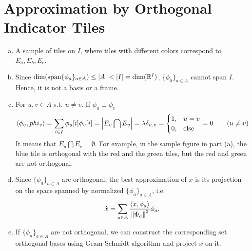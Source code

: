 \section{Approximation by Orthogonal Indicator Tiles}\label{sec:part4}

\begin{enumerate}[(a)]
\item A sample of tiles on $I$, where tiles with different colors correspond to $E_a, E_b, E_c$.

\begin{center}
\end{center}

\item Since $\dim(\text{span}\{\phi_a\}_{a \in A}) \leq \left\lvert A \right\rvert < \left\lvert I \right\rvert = \dim(\mathbb{R}^I)$,  $\{\phi_a\}_{a \in A}$ cannot span $I$. Hence, it is not a basis or a frame.

\item For $u,v \in A$ s.t. $u \neq v$. If $\phi_u \perp \phi_v$
\[\left\langle \phi_{u}, phi_{v} \right\rangle = \sum_{i \in I} \phi_{u}[i] \phi_ {v}[i] = \left\lvert E_u \bigcap E_v \right\rvert = \lambda\delta_{u,v} = \begin{cases}
1, & u=v\\
0, & \text{else}
\end{cases} = 0 \qquad(u \neq v)\]
It means that $E_u \bigcap E_v = \emptyset$. For example, in the sample figure in part (a), the blue tile is orthogonal with the red and the green tiles, but the red and green are not orthogonal.

\item Since $\{\phi_a\}_{a \in A}$ are orthogonal, the best approximation of $x$ is its projection on the space spanned by normalized $\{\phi_a\}_{a \in A}$, i.e.
\[\hat{x} = \sum_{a \in A} \frac{\left\langle x, \phi_a \right\rangle}{\left\lVert \Phi_a \right\rVert^2} \phi_a.\]

\item If $\{\phi_a\}_{a \in A}$ are not orthogonal, we can construct the corresponding set orthogonal bases using Gram-Schmidt algorithm and project $x$ on it.

\end{enumerate}
